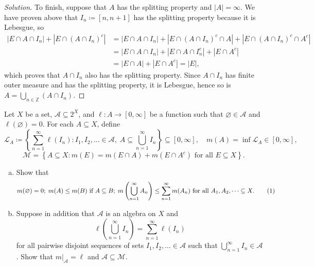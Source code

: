 \documentclass[10pt]{article}
\providecommand{\ZZ}{\mathbb Z}
\providecommand{\ii}{\item}
\newenvironment{soln}{\begin{proof}[Solution]}{\end{proof}}
\providecommand{\abs}[1]{\left|#1\right|}
\begin{document}
\begin{soln}
    To finish, suppose that $A$ has the splitting property and $|A|=\infty$.
    We have proven above that $I_n \coloneq [n,n+1]$
    has the splitting property because it is Lebesgue, so
    \begin{align*}
	\abs{E\cap A\cap I_n} + \abs{E\cap (A\cap I_n)^c}
	&= \abs{E\cap A\cap I_n} + \abs{E\cap (A\cap I_n)^c\cap A} +
	\abs{E\cap (A\cap I_n)^c\cap A^c}\\
	&= \abs{E\cap A\cap I_n} + \abs{E\cap A\cap I_n^c} + \abs{E\cap A^c}\\
	&= \abs{E\cap A} + \abs{E\cap A^c} = \abs E,
    \end{align*}
    which proves that $A\cap I_n$ also has the splitting property.
    Since $A\cap I_n$ has finite outer measure and has the splitting property,
    it is Lebesgue, hence so is $A = \bigcup_{n\in\ZZ} (A\cap I_n)$.
\end{soln}

\pagebreak

\begin{problem}
    Let $X$ be a set, $\mathcal A\subseteq 2^X$, and
    $\ell\colon A\to[0,\infty]$ be a function such that
    $\varnothing\in\mathcal A$ and $\ell(\varnothing) = 0$.
    For each $A\subseteq X$, define
    \begin{equation*}
	\mathcal L_A \coloneq
	\left\{\sum_{n=1}^\infty \ell(I_n) : I_1,I_2,\ldots\in\mathcal A,\;
	A\subseteq\bigcup_{n=1}^\infty I_n\right\}\subseteq[0,\infty],\quad
	m(A) = \inf\mathcal L_A\in[0,\infty],
    \end{equation*}
    \begin{equation}\label{eq:cara-restriction}
	\mathcal M = \left\{A\subseteq X : m(E) = m(E\cap A) + m(E\cap A^c)
	\text{ for all }E\subseteq X\right\}.
    \end{equation}
    \begin{enumerate}[(a)]
	\ii Show that
	\begin{equation*}
	    m(\varnothing)=0;\; m(A)\le m(B)\text{ if }A\subseteq B;\;
	    m\left(\bigcup_{n=1}^\infty A_n\right)\le
	    \sum_{n=1}^\infty m(A_n)\text{ for all }A_1,A_2,\dots\subseteq X.
	    \stepcounter{equation}\tag{\theequation}\label{eq:om-props}
	\end{equation*}
	\ii Suppose in addition that $\mathcal A$ is an algebra on $X$ and
	\begin{equation*}
	    \ell\left(\bigcup_{n=1}^\infty I_n\right) = \sum_{n=1}^\infty\ell(I_n)
	\end{equation*}
	for all pairwise disjoint sequences of sets
	$I_1,I_2,\ldots\in\mathcal A$ such that
	$\bigcup_{n=1}^\infty I_n\in\mathcal A$.
	Show that $m|_{\mathcal A} = \ell$ and
	$\mathcal A\subseteq\mathcal M$.
\end{enumerate}
\end{problem}
\end{document}
